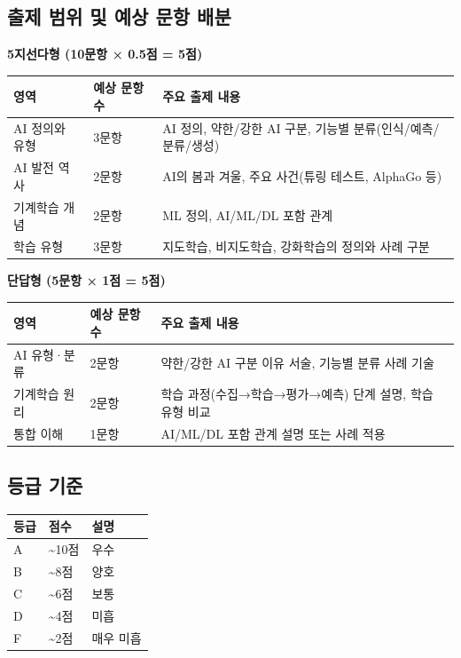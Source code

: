 \documentclass[a4paper,11pt]{ltjsarticle}
\begin{document}
\subsection{출제 범위 및 예상 문항 배분}

\textbf{5지선다형 (10문항 × 0.5점 = 5점)}

\noindent
\begin{tabularx}{\textwidth}{|p{3cm}|>{\centering\arraybackslash}p{2cm}|X|}
\hline
\textbf{영역} & \textbf{예상 문항 수} & \textbf{주요 출제 내용} \\ \hline
AI 정의와 유형 & 3문항 & AI 정의, 약한/강한 AI 구분, 기능별 분류(인식/예측/분류/생성) \\ \hline
AI 발전 역사 & 2문항 & AI의 봄과 겨울, 주요 사건(튜링 테스트, AlphaGo 등) \\ \hline
기계학습 개념 & 2문항 & ML 정의, AI/ML/DL 포함 관계 \\ \hline
학습 유형 & 3문항 & 지도학습, 비지도학습, 강화학습의 정의와 사례 구분 \\ \hline
\end{tabularx}

\vspace{0.5em}
\textbf{단답형 (5문항 × 1점 = 5점)}

\noindent
\begin{tabularx}{\textwidth}{|p{3cm}|>{\centering\arraybackslash}p{2cm}|X|}
\hline
\textbf{영역} & \textbf{예상 문항 수} & \textbf{주요 출제 내용} \\ \hline
AI 유형·분류 & 2문항 & 약한/강한 AI 구분 이유 서술, 기능별 분류 사례 기술 \\ \hline
기계학습 원리 & 2문항 & 학습 과정(수집→학습→평가→예측) 단계 설명, 학습 유형 비교 \\ \hline
통합 이해 & 1문항 & AI/ML/DL 포함 관계 설명 또는 사례 적용 \\ \hline
\end{tabularx}

\subsection{등급 기준}

\noindent
\begin{tabularx}{\textwidth}{|>{\centering\arraybackslash}p{1.5cm}|>{\centering\arraybackslash}p{2cm}|X|}
\hline
\textbf{등급} & \textbf{점수} & \textbf{설명} \\ \hline
A & 9\textasciitilde{}10점 & 우수 \\ \hline
B & 7\textasciitilde{}8점 & 양호 \\ \hline
C & 5\textasciitilde{}6점 & 보통 \\ \hline
D & 3\textasciitilde{}4점 & 미흡 \\ \hline
F & 0\textasciitilde{}2점 & 매우 미흡 \\ \hline
\end{tabularx}
\end{document}
